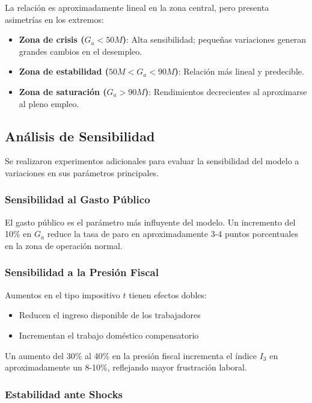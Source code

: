 La relación es aproximadamente lineal en la zona central, pero presenta asimetrías en los extremos:
\begin{itemize}
    \item \textbf{Zona de crisis ($G_a < 50M$)}: Alta sensibilidad; pequeñas variaciones generan grandes cambios en el desempleo.
    \item \textbf{Zona de estabilidad ($50M < G_a < 90M$)}: Relación más lineal y predecible.
    \item \textbf{Zona de saturación ($G_a > 90M$)}: Rendimientos decrecientes al aproximarse al pleno empleo.
\end{itemize}

\subsection{Análisis de Sensibilidad}

Se realizaron experimentos adicionales para evaluar la sensibilidad del modelo a variaciones en sus parámetros principales.

\subsubsection{Sensibilidad al Gasto Público}

El gasto público es el parámetro más influyente del modelo. Un incremento del 10\% en $G_a$ reduce la tasa de paro en aproximadamente 3-4 puntos porcentuales en la zona de operación normal.

\subsubsection{Sensibilidad a la Presión Fiscal}

Aumentos en el tipo impositivo $t$ tienen efectos dobles:
\begin{itemize}
    \item Reducen el ingreso disponible de los trabajadores
    \item Incrementan el trabajo doméstico compensatorio
\end{itemize}
Un aumento del 30\% al 40\% en la presión fiscal incrementa el índice $I_3$ en aproximadamente un 8-10\%, reflejando mayor frustración laboral.

\subsubsection{Estabilidad ante Shocks}

